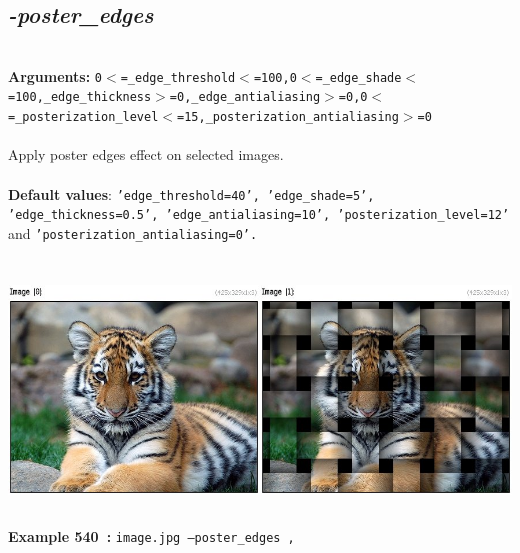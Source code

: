 \documentclass[a4paper,11pt,twoside]{book}
\begin{document}
\subsection{\emph{-poster\_edges} }\vspace*{-0.5em}
~\\\textbf{Arguments: } 
{\small \texttt{0$<$=\_edge\_threshold$<$=100,0$<$=\_edge\_shade$<$=100,\_edge\_thickness$>$=0,\_edge\_antialiasing$>$=0,0$<$=\_posterization\_level$<$=15,\_posterization\_antialiasing$>$=0}}\\~\\
Apply poster edges effect on selected images.
~\\~\\\textbf{Default values}: {\small \texttt{'edge\_threshold=40', 'edge\_shade=5', 'edge\_thickness=0.5', 'edge\_antialiasing=10', 'posterization\_level=12'} and \texttt{'posterization\_antialiasing=0'.}}
\begin{center}\includegraphics[keepaspectratio=true,height=7cm,width=\textwidth]{img/gmic_def540.jpg}\\
{\footnotesize \textbf{Example 540~:} \texttt{image.jpg --poster\_edges ,}}
\end{center}
\end{document}
